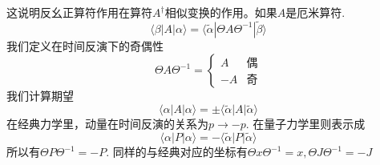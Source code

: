 \documentclass{article}
\numberwithin{equation}{subsection}
\begin{document}
这说明反幺正算符作用在算符$A^\dagger$相似变换的作用。如果$A$是厄米算符.
\begin{equation}
    \langle\beta|A|\alpha\rangle=\langle\tilde{\alpha}|\Theta A\Theta^{-1}|\tilde{\beta}\rangle
\end{equation}
我们定义在时间反演下的奇偶性
\begin{equation}
    \Theta A\Theta^{-1}=\begin{cases}
        A&\text{偶}\\
        -A&\text{奇}
    \end{cases}
\end{equation}
我们计算期望
\begin{equation}
    \langle\alpha|A|\alpha\rangle=\pm\langle\tilde{\alpha}|A|\tilde{\alpha}\rangle
\end{equation}
在经典力学里，动量在时间反演的关系为$p\rightarrow-p$. 在量子力学里则表示成
\begin{equation}
    \langle\alpha|P|\alpha\rangle=-\langle\tilde{\alpha}|P|\tilde{\alpha}\rangle
\end{equation}
所以有$\Theta P\Theta^{-1}=-P$. 同样的与经典对应的坐标有$\Theta x\Theta^{-1}=x,\Theta J\Theta^{-1}=-J$
\end{document}
